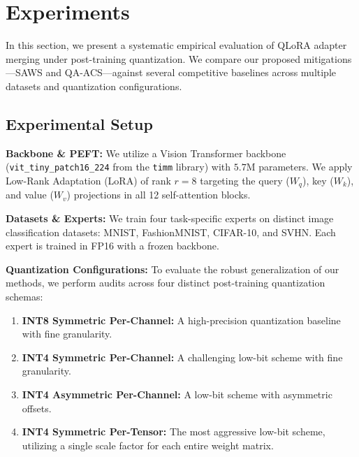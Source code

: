 \section{Experiments}
\label{sec:experiments}

In this section, we present a systematic empirical evaluation of QLoRA adapter merging under post-training quantization. We compare our proposed mitigations—SAWS and QA-ACS—against several competitive baselines across multiple datasets and quantization configurations.

\subsection{Experimental Setup}

\textbf{Backbone \& PEFT:} We utilize a Vision Transformer backbone (\texttt{vit\_tiny\_patch16\_224} from the \texttt{timm} library) with $5.7\text{M}$ parameters. We apply Low-Rank Adaptation (LoRA) of rank $r=8$ targeting the query ($W_q$), key ($W_k$), and value ($W_v$) projections in all 12 self-attention blocks. 

\textbf{Datasets \& Experts:} We train four task-specific experts on distinct image classification datasets: MNIST, FashionMNIST, CIFAR-10, and SVHN. Each expert is trained in FP16 with a frozen backbone.

\textbf{Quantization Configurations:} To evaluate the robust generalization of our methods, we perform audits across four distinct post-training quantization schemas:
\begin{enumerate}
  \item \textbf{INT8 Symmetric Per-Channel:} A high-precision quantization baseline with fine granularity.
  \item \textbf{INT4 Symmetric Per-Channel:} A challenging low-bit scheme with fine granularity.
  \item \textbf{INT4 Asymmetric Per-Channel:} A low-bit scheme with asymmetric offsets.
  \item \textbf{INT4 Symmetric Per-Tensor:} The most aggressive low-bit scheme, utilizing a single scale factor for each entire weight matrix.
\end{enumerate}

